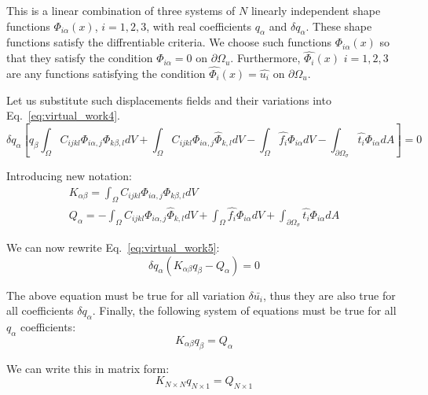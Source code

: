 \documentclass[en]{minipw} %
\begin{document}
This is a linear combination of three systems of $N$ linearly independent shape functions $\Phi_{i \alpha}(x)$, $i = 1,2,3$, with real coefficients $q_{\alpha}$ and $\delta q_{\alpha}$. These shape functions satisfy the diffrentiable criteria. We choose such functions $\Phi_{i \alpha}(x)$ so that they satisfy the condition $\Phi_{i \alpha} = 0$ on $\partial \Omega_{u}$. Furthermore, $\hat{\Phi_i}(x)$ $i = 1,2,3$ are any functions satisfying the condition $\hat{\Phi_{i}}(x) = \hat{u_i}$ on $\partial \Omega_{u}$.

Let us substitute such displacements fields and their variations into Eq.~\ref{eq:virtual_work4}.
\begin{equation}
\label{eq:virtual_work5}
\delta q_{\alpha}[ q_{\beta} \int_{\Omega} C_{ijkl} \Phi_{i \alpha,j} \Phi_{k \beta,l} dV + \int_{\Omega} C_{ijkl} \Phi_{i \alpha,j} \hat{\Phi}_{k,l} dV - \int_{\Omega} \hat{f_i} \Phi_{i \alpha} dV - \int_{\partial \Omega_{\sigma}} \hat{t_i}\Phi_{i \alpha} dA] = 0
\end{equation}

Introducing new notation:
\begin{equation}
\begin{aligned}
K_{\alpha \beta} = \int_{\Omega} C_{ijkl} \Phi_{i \alpha,j} \Phi_{k \beta,l} dV 
\\
Q_{\alpha} = - \int_{\Omega} C_{ijkl} \Phi_{i \alpha,j} \hat{\Phi}_{k,l} dV + \int_{\Omega} \hat{f_i} \Phi_{i \alpha} dV + \int_{\partial \Omega_{\sigma}} \hat{t_i}\Phi_{i \alpha} dA
\end{aligned}
\end{equation}

We can now rewrite Eq.~\ref{eq:virtual_work5}:
\begin{equation}
\delta q_{\alpha}(K_{\alpha \beta} q_{\beta} - Q_{\alpha}) = 0
\end{equation}

The above equation must be true for all variation $\delta \bar{u_i}$, thus they are also true for all coefficients $\delta q_{\alpha}$. Finally, the following system of equations must be true for all $q_{\alpha}$ coefficients:
\begin{equation}
K_{\alpha \beta} q_{\beta} = Q_{\alpha}
\end{equation}

We can write this in matrix form:
\begin{equation}
\label{eq:fem_system}
K_{N \times N} q_{N \times 1} = Q_{N \times 1}
\end{equation}
\end{document}
